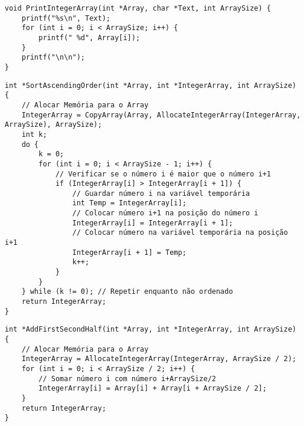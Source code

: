\begin{lstlisting}[caption=Mostrar Vetor, label=chap4:code:5]
void PrintIntegerArray(int *Array, char *Text, int ArraySize) {
    printf("%s\n", Text);
    for (int i = 0; i < ArraySize; i++) {
        printf(" %d", Array[i]);
    }
    printf("\n\n");
}
\end{lstlisting}

\begin{lstlisting}[caption=Ordenar Vetor por Ordem Crescente, label=chap4:code:6]
int *SortAscendingOrder(int *Array, int *IntegerArray, int ArraySize) {
    // Alocar Memória para o Array
    IntegerArray = CopyArray(Array, AllocateIntegerArray(IntegerArray, ArraySize), ArraySize);
    int k;
    do {
        k = 0;
        for (int i = 0; i < ArraySize - 1; i++) {
            // Verificar se o número i é maior que o número i+1
            if (IntegerArray[i] > IntegerArray[i + 1]) {
                // Guardar número i na variável temporária
                int Temp = IntegerArray[i];
                // Colocar número i+1 na posição do número i
                IntegerArray[i] = IntegerArray[i + 1];
                // Colocar número na variável temporária na posição i+1
                IntegerArray[i + 1] = Temp;
                k++;
            }
        }
    } while (k != 0); // Repetir enquanto não ordenado
    return IntegerArray;
}
\end{lstlisting}

\begin{lstlisting}[caption=Adicionar Primeira metade à Segunda Metade do Vetor., label=chap4:code:7]
int *AddFirstSecondHalf(int *Array, int *IntegerArray, int ArraySize) {
    // Alocar Memória para o Array
    IntegerArray = AllocateIntegerArray(IntegerArray, ArraySize / 2);
    for (int i = 0; i < ArraySize / 2; i++) {
        // Somar número i com número i+ArraySize/2
        IntegerArray[i] = Array[i] + Array[i + ArraySize / 2]; 
    }
    return IntegerArray;
}
\end{lstlisting}

\newpage

